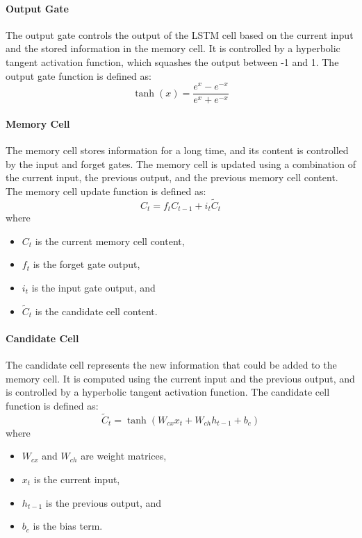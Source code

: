\documentclass[
]{article}
\providecommand{\tightlist}{%
  \setlength{\itemsep}{0pt}\setlength{\parskip}{0pt}}
\begin{document}
\hypertarget{output-gate}{%
\paragraph{Output Gate}\label{output-gate}}

The output gate controls the output of the LSTM cell based on the
current input and the stored information in the memory cell. It is
controlled by a hyperbolic tangent activation function, which squashes
the output between -1 and 1. The output gate function is defined as:
\[ \tanh(x) = \frac{e^x - e^{-x}}{e^x + e^{-x}} \]

\hypertarget{memory-cell}{%
\paragraph{Memory Cell}\label{memory-cell}}

The memory cell stores information for a long time, and its content is
controlled by the input and forget gates. The memory cell is updated
using a combination of the current input, the previous output, and the
previous memory cell content. The memory cell update function is defined
as: \[ C_t = f_t C_{t-1} + i_t \tilde{C}_t \] where

\begin{itemize}
\tightlist
\item
  \(C_t\) is the current memory cell content,
\item
  \(f_t\) is the forget gate output,
\item
  \(i_t\) is the input gate output, and
\item
  \(\tilde{C}_t\) is the candidate cell content.
\end{itemize}

\hypertarget{candidate-cell}{%
\paragraph{Candidate Cell}\label{candidate-cell}}

The candidate cell represents the new information that could be added to
the memory cell. It is computed using the current input and the previous
output, and is controlled by a hyperbolic tangent activation function.
The candidate cell function is defined as:
\[ \tilde{C}_t = \tanh(W_{cx} x_t + W_{ch} h_{t-1} + b_c) \] where

\begin{itemize}
\tightlist
\item
  \(W_{cx}\) and \(W_{ch}\) are weight matrices,
\item
  \(x_t\) is the current input,
\item
  \(h_{t-1}\) is the previous output, and
\item
  \(b_c\) is the bias term.
\end{itemize}
\end{document}
